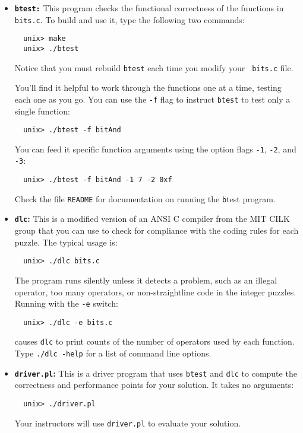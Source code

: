 \documentclass[11pt]{article}
\begin{document}
\begin{itemize}
\item {\bf \texttt{btest:}} This program checks the functional correctness of
  the functions in {\tt bits.c}. To build and use it, type the
  following two commands:
\begin{verbatim}
  unix> make
  unix> ./btest
\end{verbatim}
Notice that you must rebuild \texttt{btest} each time you modify your {\tt
  bits.c} file. 

You'll find it helpful to work through the functions one at a time,
testing each one as you go.  You can use the {\tt -f} flag to instruct
\texttt{btest} to test only a single function:
\begin{verbatim}
  unix> ./btest -f bitAnd
\end{verbatim}
You can feed it specific function arguments
using the option flags {\tt -1}, {\tt -2}, and {\tt -3}:
\begin{verbatim}
  unix> ./btest -f bitAnd -1 7 -2 0xf
\end{verbatim}
Check the file {\tt README} for documentation on running the {\texttt
  btest} program.


\item {\bf \texttt{dlc}:} This is a modified version of an ANSI C compiler from
the MIT CILK group that you can use to check for compliance with the
coding rules for each puzzle. The typical usage is:
\begin{verbatim}
  unix> ./dlc bits.c
\end{verbatim}
The program runs silently unless it detects a problem, such as an
illegal operator, too many operators, or non-straightline code in the
integer puzzles.  Running with the \texttt{-e} switch:
\begin{verbatim}
  unix> ./dlc -e bits.c  
\end{verbatim}
causes \texttt{dlc} to print counts of the number of operators used by
each function. Type {\tt ./dlc -help} for a list of command line options. 

\item {\bf \texttt{driver.pl}:} This is a driver program that uses \texttt{btest}
and \texttt{dlc} to compute the correctness and performance points for
your solution. It takes no arguments:
\begin{verbatim}
  unix> ./driver.pl
\end{verbatim}
Your instructors will use \texttt{driver.pl} to evaluate your
solution.

\end{itemize}
\end{document}
